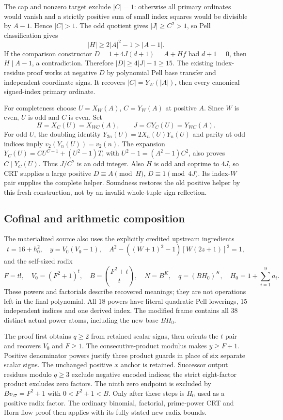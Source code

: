 \documentclass[11pt]{article}
\begin{document}
The cap and nonzero target exclude $|C|=1$: otherwise all primary ordinates
would vanish and a strictly positive sum of small index squares would be
divisible by $A-1$. Hence $|C|>1$. The odd quotient gives $|J|\ge C^2>1$,
so Pell classification gives
\[
 |H|\ge 2|A|^2-1>|A-1|.
\]
If the comparison constructor $D=1+4J(d+1)=A+Hf$ had $d+1=0$, then
$H\mid A-1$, a contradiction. Therefore $|D|\ge4|J|-1\ge15$.
The existing index-residue proof works at negative $D$ by polynomial Pell
base transfer and independent coordinate signs. It recovers
$|C|=Y_W(|A|)$, then every canonical signed-index primary ordinate.

For completeness choose $U=X_W(A)$, $C=Y_W(A)$ at positive $A$.
Since $W$ is even, $U$ is odd and $C$ is even. Set
\[
 H=X_C(U)=X_{WC}(A),\qquad
 J=C Y_C(U)=Y_{WC}(A).
\]
For odd $U$, the doubling identity $Y_{2n}(U)=2X_n(U)Y_n(U)$ and parity
at odd indices imply $v_2(Y_n(U))=v_2(n)$. The expansion
$Y_C(U)=CU^{C-1}+(U^2-1)T$, with
$U^2-1=(A^2-1)C^2$, also proves $C\mid Y_C(U)$.
Thus $J/C^2$ is an odd integer.
Also $H$ is odd and coprime to $4J$, so CRT supplies a large positive
$D\equiv A\pmod H$, $D\equiv1\pmod{4J}$. Its index-$W$ pair supplies
the complete helper. Soundness restores the old positive helper by this
fresh construction, not by an invalid whole-tuple sign reflection.

\subsection{Cofinal and arithmetic composition}
The materialized source also uses the explicitly credited upstream ingredients
\[
 t=16+h_0^2,\quad y=V_0(V_0-1),\quad
 A^2-((W+1)^2-1)[W(2z+1)]^2=1,
\]
and the self-sized radix
\[
 F=t!,\quad V_0=(F^2+1)^t,\quad B=\binom{F^2+t}{t},\quad
 N=B^K,\quad q=(BH_0)^K,\quad H_0=1+\sum_{i=1}^9 a_i.
\]
These powers and factorials describe recovered meanings; they are not operations
left in the final polynomial. All 18 powers have literal quadratic Pell
lowerings, 15 independent indices and one derived index. The modified frame
contains all 38 distinct actual power atoms, including the new base $BH_0$.

The proof first obtains $q\ge2$ from retained scalar signs, then orients the
$t$ pair and recovers $V_0$ and $F\ge1$. The consecutive-product modulus
makes $y\ge F+1$. Positive denominator powers justify three product guards
in place of six separate scalar signs. The unchanged positive $x$ anchor
is retained. Successor output residues modulo $q\ge3$ exclude negative
encoded indices; the strict eight-factor product excludes zero factors.
The ninth zero endpoint is excluded by
$Bv_{27}=F^2+1$ with $0<F^2+1<B$. Only after these steps is $H_0$ used
as a positive radix factor. The ordinary binomial, factorial, prime-power CRT
and Horn-flow proof then applies with its fully stated new radix bounds.
\end{document}
